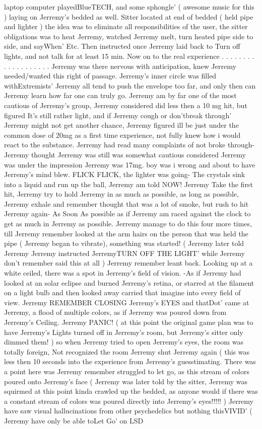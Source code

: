 \documentclass[12pt]{book}
\begin{document}
laptop computer playedBlueTECH, and some sphongle' ( awesome music for this ) laying on Jerremy's bedded as well. Sitter located at end of bedded ( held pipe and lighter ) the idea was to eliminate all responsibilities of the user, the sitter obligations was to heat Jerremy, watched Jerremy melt, turn heated pipe side to side, and sayWhen' Etc. Then instructed once Jerremy laid back to Turn off lights, and not talk for at least 15 min. Now on to the real experience . . .   . . .   . . .   . . .   . . .   . . .  . Jerremy was there nervous with anticipation, knew Jerremy needed/wanted this right of passage. Jerremy's inner circle was filled withExtremists' Jerremy all tend to push the envelope too far, and only then can Jerremy learn how far one can truly go. Jerremy am by far one of the most cautious of Jerremy's group, Jerremy considered did less then a 10 mg hit, but figured It's still rather light, and if Jerremy cough or don'tbreak through' Jerremy might not get another chance, Jerremy figured ill be just under the common dose of 20mg as a first time experience, not fully knew how i would react to the substance. Jerremy had read many complaints of not broke through- Jerremy thought Jerremy was still was somewhat cautious considered Jerremy was under the impression Jerremy was 17mg. boy was i wrong and about to have Jerremy's mind blew. FLICK FLICK, the lighter was going- The crystals sink into a liquid and run up the ball, Jerremy am told NOW! Jerremy Take the first hit, Jerremy try to hold Jerremy in as much as possible, as long as possible, Jerremy exhale and remember thought that was a lot of smoke, but rush to hit Jerremy again- As Soon As possible as if Jerremy am raced against the clock to get as much in Jerremy as possible. Jerremy manage to do this four more times, till Jerremy remember looked at the arm hairs on the person that was held the pipe ( Jerremy began to vibrate), something was started! ( Jerremy later told Jerremy Jerremy instructed JerremyTURN OFF THE LIGHT' while Jerremy don't remember said this at all ) Jerremy remember leant back. Looking up at a white ceiled, there was a spot in Jerremy's field of vision. -As if Jerremy had looked at an solar eclipse and burned Jerremy's retina, or starred at the filament on a light bulb and then looked away carried that imagine into every field of view. Jerremy REMEMBER CLOSING Jerremy's EYES and thatDot' came at Jerremy, a flood of multiple colors, as if Jerremy was poured down from Jerremy's Ceiling. Jerremy PANIC! (  at this point the original game plan was to have Jerremy's Lights turned off in Jerremy's room, but Jerremy's sitter only dimmed them! ) so when Jerremy tried to open Jerremy's eyes, the room was totally foreign, Not recognized the room Jerremy shut Jerremy again (  this was less then 10 seconds into the experience from Jerremy's guesstimating. There was a point here was Jerremy remember struggled to let go, as this stream of colors poured onto Jerremy's face ( Jerremy was later told by the sitter, Jerremy was squirmed at this point kinda crawled up the bedded, as anyone would if there was a constant stream of colors was poured directly into Jerremy's eyes!!!!! ) Jerremy have saw visual hallucinations from other psychedelics but nothing thisVIVID' ( Jerremy have only be able toLet Go' on LSD 
\end{document}
